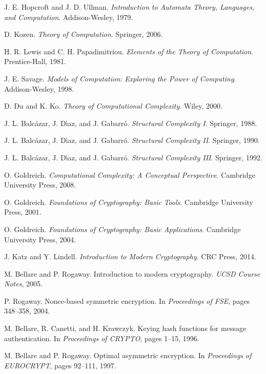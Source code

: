 \documentclass[11pt]{article}
\theoremstyle{definition}
\begin{document}
\begin{thebibliography}{99}
 J. E. Hopcroft and J. D. Ullman. \emph{Introduction to Automata Theory, Languages, and Computation}. Addison-Wesley, 1979.

 D. Kozen. \emph{Theory of Computation}. Springer, 2006.

 H. R. Lewis and C. H. Papadimitriou. \emph{Elements of the Theory of Computation}. Prentice-Hall, 1981.

 J. E. Savage. \emph{Models of Computation: Exploring the Power of Computing}. Addison-Wesley, 1998.

 D. Du and K. Ko. \emph{Theory of Computational Complexity}. Wiley, 2000.

 J. L. Balc\'azar, J. D\'{\i}az, and J. Gabarr\'o. \emph{Structural Complexity I}. Springer, 1988.

 J. L. Balc\'azar, J. D\'{\i}az, and J. Gabarr\'o. \emph{Structural Complexity II}. Springer, 1990.

 J. L. Balc\'azar, J. D\'{\i}az, and J. Gabarr\'o. \emph{Structural Complexity III}. Springer, 1992.

 O. Goldreich. \emph{Computational Complexity: A Conceptual Perspective}. Cambridge University Press, 2008.

 O. Goldreich. \emph{Foundations of Cryptography: Basic Tools}. Cambridge University Press, 2001.

 O. Goldreich. \emph{Foundations of Cryptography: Basic Applications}. Cambridge University Press, 2004.

 J. Katz and Y. Lindell. \emph{Introduction to Modern Cryptography}. CRC Press, 2014.

 M. Bellare and P. Rogaway. Introduction to modern cryptography. \emph{UCSD Course Notes}, 2005.

 P. Rogaway. Nonce-based symmetric encryption. In \emph{Proceedings of FSE}, pages 348--358, 2004.

 M. Bellare, R. Canetti, and H. Krawczyk. Keying hash functions for message authentication. In \emph{Proceedings of CRYPTO}, pages 1--15, 1996.

 M. Bellare and P. Rogaway. Optimal asymmetric encryption. In \emph{Proceedings of EUROCRYPT}, pages 92--111, 1997.


\end{thebibliography}
\end{document}
